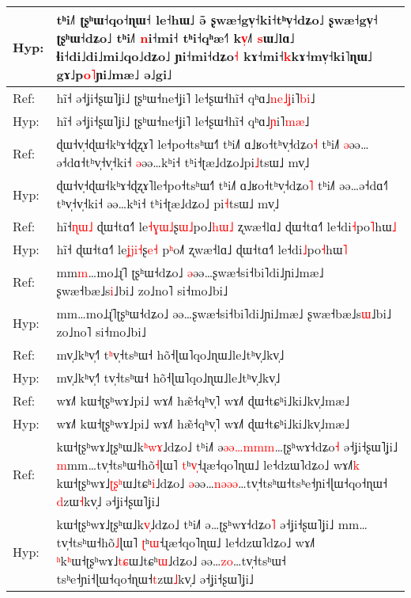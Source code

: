 \documentclass[10pt]{article}
\DeclareRobustCommand{\hl}[1]{{\textcolor{red}{#1}}}
\begin{document}
\begin{longtable}{ll}
Hyp: & tʰi˩˥ ʈʂʰɯ˧qo˧ɳɯ˧ le˧hɯ˩ ə\hl{̃}\hl{ }ʂwæ˧gv̩˧ki˧tʰv̩˧dʑo˩ ʂwæ˧gv̩˧\hl{ }ʈʂʰɯ˧dʑo˩ tʰi˩˥ \hl{n}i˧mi˧\hl{ }tʰi˧qʰæ˧˥ k\hl{v}\hl{̩}˩\hl{˥}\hl{ }\hl{s}ɯ˩lɑ˩ ɬi˧di˩di˩mi˩qo˩dʑo˩ ɲi˧mi˧dʑo\hl{˧} kɤ˧mi˧\hl{k}kɤ˧mv̩˧ki˥ɳɯ˩ gɤ˩p\hl{o}\hl{˥}ɲi˩mæ˩ ə˩gi˩ \\ 
\midrule 
Ref: & hĩ˧ ə˧ʝi˧ʂɯ˥ʝi˩ ʈʂʰɯ˧ne˧ʝi˥ le˧ʂɯ˧hĩ˧ qʰɑ˩\hl{n}\hl{e}\hl{˩}\hl{ʝ}i˥\hl{b}\hl{i}˩ \\ 
Hyp: & hĩ˧ ə˧ʝi˧ʂɯ˥ʝi˩ ʈʂʰɯ˧ne˧ʝi˥ le˧ʂɯ˧hĩ˧ qʰɑ˩\hl{ɲ}i˥\hl{m}\hl{æ}˩ \\ 
\midrule 
Ref: & ɖɯ˧v̩˧ɖɯ˧kʰɤ˧ɖʐɤ˥\hl{ }le˧po˧tsʰɯ˧˥ tʰi˩˥ ɑ˩ʁo˧tʰv̩˧dʑo\hl{˧} tʰi˩˥ \hl{ə}əə…ə˧dɑ˧tʰv̩˧v̩˧ki˧ \hl{ə}əə…kʰi˧ tʰi˧ʈæ˩dʑo˩pi\hl{˩}tsɯ˩ mv̩˩ \\ 
Hyp: & ɖɯ˧v̩˧ɖɯ˧kʰɤ˧ɖʐɤ˥le˧po˧tsʰɯ˧˥ tʰi˩˥ ɑ˩ʁo˧tʰv̩˧dʑo\hl{˥} tʰi˩˥ əə…ə˧dɑ˧\hl{˥}\hl{ }tʰv̩˧v̩˧ki˧ əə…kʰi˧ tʰi˧ʈæ˩dʑo˩\hl{ }pi\hl{˧}tsɯ˩ mv̩˩ \\ 
\midrule 
Ref: & hĩ˧\hl{ɳ}\hl{ɯ}\hl{˩} ɖɯ˧tɑ˧˥ le\hl{˧}\hl{ɣ}\hl{ɯ}\hl{˩}ʂ\hl{ɯ}\hl{˩}po˩\hl{h}\hl{ɯ}\hl{˩} ʐwæ˧lɑ˩ ɖɯ˧tɑ˧˥ le˧di\hl{˧}po\hl{˥}hɯ\hl{˩} \\ 
Hyp: & hĩ˧ ɖɯ˧tɑ˧˥ le\hl{ʝ}\hl{j}\hl{i}\hl{˧}ʂ\hl{e}\hl{˧}\hl{ }p\hl{ʰ}o˩\hl{˥} ʐwæ˧lɑ˩ ɖɯ˧tɑ˧˥ le˧di\hl{˩}po\hl{˧}hɯ\hl{˥} \\ 
\midrule 
Ref: & mm\hl{m}…mo˩ɻ̍˥\hl{ }ʈʂʰɯ˧dʑo˩ \hl{ə}əə…ʂwæ˧si˧bi˥di˩ɲi˩mæ˩ ʂwæ˧bæ˩s\hl{i}˩bi˩ zo˩no˥ si˧mo˩bi˩ \\ 
Hyp: & mm…mo˩ɻ̍˥ʈʂʰɯ˧dʑo˩ əə…ʂwæ˧si˧bi˥di˩ɲi˩mæ˩ ʂwæ˧bæ˩s\hl{ɯ}˩bi˩ zo˩no˥ si˧mo˩bi˩ \\ 
\midrule 
Ref: & mv̩˩kʰv̩˧˥ t\hl{ʰ}v̩˧tsʰɯ˧ hõ˧ɭɯ˥qo˩ɳɯ˩le˩tʰv̩˩kv̩˩ \\ 
Hyp: & mv̩˩kʰv̩˧˥ tv̩˧tsʰɯ˧ hõ˧ɭɯ˥qo˩ɳɯ˩le˩tʰv̩˩kv̩˩ \\ 
\midrule 
Ref: & wɤ˩˥ kɯ˧ʈʂʰwɤ˩pi˩ wɤ˩˥ hæ̃˧qʰv̩˥ wɤ˩˥ ɖɯ˧tɕʰi˩ki˩kv̩˩mæ˩ \\ 
Hyp: & wɤ˩˥ kɯ˧ʈʂʰwɤ˩pi˩ wɤ˩˥ hæ̃˧qʰv̩˥ wɤ˩˥ ɖɯ˧tɕʰi˩ki˩kv̩˩mæ˩ \\ 
\midrule 
Ref: & kɯ˧ʈʂʰwɤ˩ʈʂʰɯ˩k\hl{ʰ}\hl{w}\hl{ɤ}˩dʑo˩ tʰi˩˥ ə\hl{ə}\hl{ə}\hl{…}\hl{m}\hl{m}\hl{m}…ʈʂʰwɤ˧dʑo\hl{˧} ə˧ʝi˧ʂɯ˥ʝi˩ \hl{m}mm…tv̩˧tsʰɯ˧hõ\hl{˧}ɭɯ˥ \hl{t}ʰ\hl{v}\hl{̩}˧ɻæ˧qo˥ɳɯ˩ le˧dzɯ˥dʑo˩ wɤ˩˥\hl{k}\hl{ }kɯ˧ʈʂʰwɤ˩\hl{ʈ}\hl{ʂ}\hl{ʰ}ɯ˩tɕʰ\hl{i}˩dʑo˩ \hl{ə}əə…\hl{n}\hl{ə}\hl{ə}\hl{ə}…tv̩˧tsʰɯ˧tsʰe˧ɲi˧ɭɯ˧qo˧ɳɯ˧\hl{ }\hl{d}zɯ\hl{˧}kv̩˩ ə˧ʝi˧ʂɯ˥ʝi˩ \\ 
Hyp: & kɯ˧ʈʂʰwɤ˩ʈʂʰɯ˩k\hl{v}\hl{̩}˩dʑo˩ tʰi˩˥ ə…ʈʂʰwɤ˧dʑo\hl{˥} ə˧ʝi˧ʂɯ˥ʝi˩ mm…tv̩˧tsʰɯ˧hõ\hl{˩}ɭɯ˥ \hl{ʈ}ʰ\hl{ɯ}˧ɻæ˧qo˥ɳɯ˩ le˧dzɯ˥dʑo˩ wɤ˩˥\hl{ }\hl{ʰ}k\hl{ʰ}ɯ˧ʈʂʰwɤ˩\hl{t}\hl{ɕ}ɯ˩tɕʰ\hl{ɯ}˩dʑo˩ əə…\hl{z}\hl{o}…tv̩˧tsʰɯ˧\hl{ }tsʰe˧ɲi˧ɭɯ˧qo˧ɳɯ˧\hl{t}zɯ\hl{˩}kv̩˩ ə˧ʝi˧ʂɯ˥ʝi˩ \\ 

\end{longtable}
\end{document}
